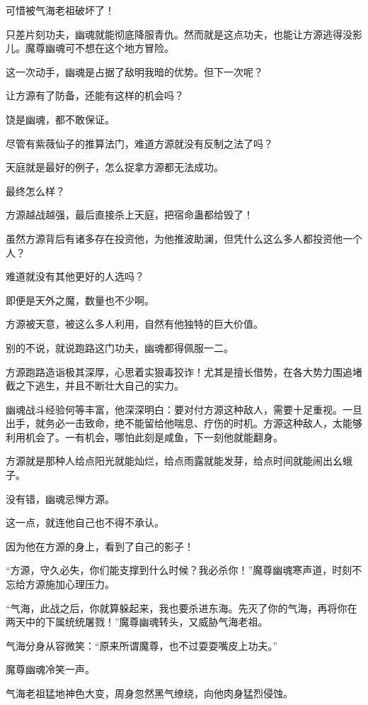 \begin{this_body}
可惜被气海老祖破坏了！

只差片刻功夫，幽魂就能彻底降服青仇。然而就是这点功夫，也能让方源逃得没影儿。魔尊幽魂可不想在这个地方冒险。

这一次动手，幽魂是占据了敌明我暗的优势。但下一次呢？

让方源有了防备，还能有这样的机会吗？

饶是幽魂，都不敢保证。

尽管有紫薇仙子的推算法门，难道方源就没有反制之法了吗？

天庭就是最好的例子，怎么捉拿方源都无法成功。

最终怎么样？

方源越战越强，最后直接杀上天庭，把宿命蛊都给毁了！

虽然方源背后有诸多存在投资他，为他推波助澜，但凭什么这么多人都投资他一个人？

难道就没有其他更好的人选吗？

即便是天外之魔，数量也不少啊。

方源被天意，被这么多人利用，自然有他独特的巨大价值。

别的不说，就说跑路这门功夫，幽魂都得佩服一二。

方源跑路造诣极其深厚，心思着实狠毒狡诈！尤其是擅长借势，在各大势力围追堵截之下逃生，并且不断壮大自己的实力。

幽魂战斗经验何等丰富，他深深明白：要对付方源这种敌人，需要十足重视。一旦出手，就务必一击致命，绝不能留给他喘息、疗伤的时机。方源这种敌人，太能够利用机会了。一有机会，哪怕此刻是咸鱼，下一刻他就能翻身。

方源就是那种人给点阳光就能灿烂，给点雨露就能发芽，给点时间就能闹出幺蛾子。

没有错，幽魂忌惮方源。

这一点，就连他自己也不得不承认。

因为他在方源的身上，看到了自己的影子！

“方源，守久必失，你们能支撑到什么时候？我必杀你！”魔尊幽魂寒声道，时刻不忘给方源施加心理压力。

“气海，此战之后，你就算躲起来，我也要杀进东海。先灭了你的气海，再将你在两天中的下属统统屠戮！”魔尊幽魂转头，又威胁气海老祖。

气海分身从容微笑：“原来所谓魔尊，也不过耍耍嘴皮上功夫。”

魔尊幽魂冷笑一声。

气海老祖猛地神色大变，周身忽然黑气缭绕，向他肉身猛烈侵蚀。


\end{this_body}
